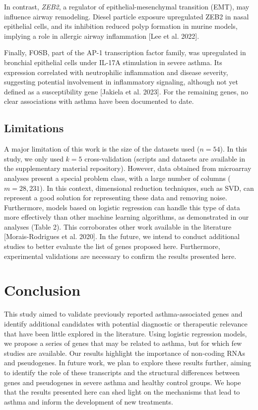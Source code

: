 In contrast, \textit{ZEB2}, a regulator of epithelial-mesenchymal transition (EMT), may influence airway remodeling. Diesel particle exposure upregulated ZEB2 in nasal epithelial cells, and its inhibition reduced polyp formation in murine models, implying a role in allergic airway inflammation [Lee et al. 2022].

Finally, FOSB, part of the AP-1 transcription factor family, was upregulated in bronchial epithelial cells under IL-17A stimulation in severe asthma. Its expression correlated with neutrophilic inflammation and disease severity, suggesting potential involvement in inflammatory signaling, although not yet defined as a susceptibility gene [Jakiela et al. 2023]. For the remaining genes, no clear associations with asthma have been documented to date.

\subsection{Limitations}

A major limitation of this work is the size of the datasets used ($n = 54$). In this study, we only used $k = 5$ cross-validation (scripts and datasets are available in the supplementary material repository). However, data obtained from microarray analyses present a special problem class, with a large number of columns ($m = 28,231$). In this context, dimensional reduction techniques, such as SVD, can represent a good solution for representing these data and removing noise. Furthermore, models based on logistic regression can handle this type of data more effectively than other machine learning algorithms, as demonstrated in our analyses (Table 2). This corroborates other work available in the literature [Morais-Rodrigues et al. 2020]. In the future, we intend to conduct additional studies to better evaluate the list of genes proposed here. Furthermore, experimental validations are necessary to confirm the results presented here.

\section{Conclusion}

This study aimed to validate previously reported asthma-associated genes and identify additional candidates with potential diagnostic or therapeutic relevance that have been little explored in the literature. Using logistic regression models, we propose a series of genes that may be related to asthma, but for which few studies are available. Our results highlight the importance of non-coding RNAs and pseudogenes. In future work, we plan to explore these results further, aiming to identify the role of these transcripts and the structural differences between genes and pseudogenes in severe asthma and healthy control groups. We hope that the results presented here can shed light on the mechanisms that lead to asthma and inform the development of new treatments.



